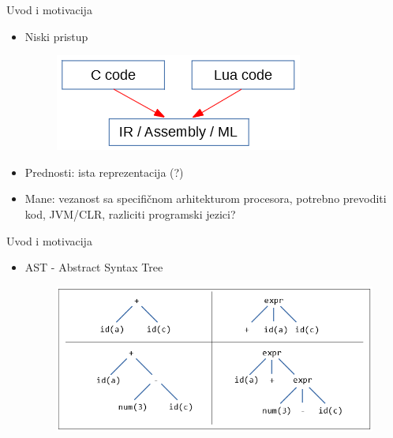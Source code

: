 \documentclass{beamer}
\begin{document}
\begin{frame}{Uvod i motivacija}
    \begin{itemize}
        \item Niski pristup
        \begin{figure}[h!]
            \centering
            \includegraphics[scale=0.8]{images/approach_1.PNG}
        \end{figure}
        \item Prednosti: ista reprezentacija (?)
        \item Mane: vezanost sa specifi\v{c}nom arhitekturom procesora, potrebno prevoditi kod, JVM/CLR, razliciti programski jezici?
    \end{itemize}
\end{frame}

\begin{frame}{Uvod i motivacija}
    \begin{itemize}
        \item AST - Abstract Syntax Tree
        \begin{figure}[h!]
            \centering
            \includegraphics[scale=0.55]{images/ast.PNG}
        \end{figure}
    \end{itemize}
\end{frame}
\end{document}
